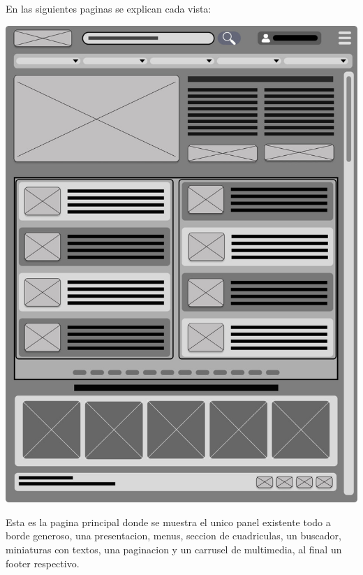 \documentclass[a4paper,12pt]{article}
\begin{document}
\begin{itemize}
En las siguientes paginas se explican cada vista: 

\par \includegraphics[scale=0.85]{m1} \par

Esta es la pagina principal donde se muestra el unico panel existente todo a borde generoso, una presentacion, menus, seccion de cuadriculas, un buscador, miniaturas con textos, una paginacion y un carrusel de multimedia, al final un footer respectivo.


\end{itemize}
\end{document}
